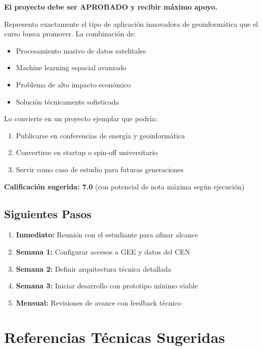 \documentclass[12pt,a4paper]{article}
\begin{document}
\begin{tcolorbox}[colback=blue!5!white,colframe=usachblue,title=\textbf{RECOMENDACIÓN DEL PROFESOR}]
\textbf{El proyecto debe ser APROBADO y recibir máximo apoyo.}

Representa exactamente el tipo de aplicación innovadora de geoinformática que el curso busca promover. La combinación de:
\begin{itemize}
    \item Procesamiento masivo de datos satelitales
    \item Machine learning espacial avanzado
    \item Problema de alto impacto económico
    \item Solución técnicamente sofisticada
\end{itemize}

Lo convierte en un proyecto ejemplar que podría:
\begin{enumerate}
    \item Publicarse en conferencias de energía y geoinformática
    \item Convertirse en startup o spin-off universitario
    \item Servir como caso de estudio para futuras generaciones
\end{enumerate}

\textbf{Calificación sugerida: 7.0} (con potencial de nota máxima según ejecución)
\end{tcolorbox}

\subsection{Siguientes Pasos}

\begin{enumerate}
    \item \textbf{Inmediato:} Reunión con el estudiante para afinar alcance
    \item \textbf{Semana 1:} Configurar accesos a GEE y datos del CEN
    \item \textbf{Semana 2:} Definir arquitectura técnica detallada
    \item \textbf{Semana 3:} Iniciar desarrollo con prototipo mínimo viable
    \item \textbf{Mensual:} Revisiones de avance con feedback técnico
\end{enumerate}

\section{Referencias Técnicas Sugeridas}
\end{document}
